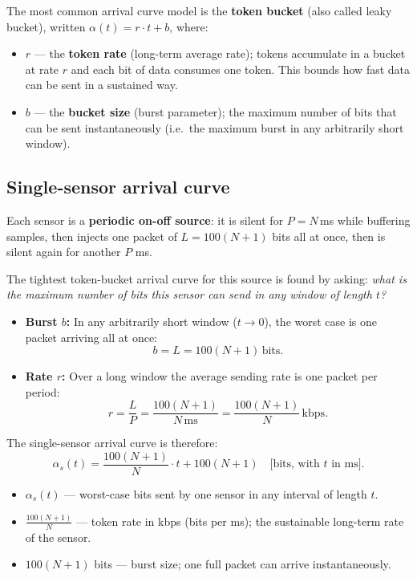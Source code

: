 \documentclass[12pt, a4paper]{article}
\begin{document}
The most common arrival curve model is the \textbf{token bucket} (also called
leaky bucket), written $\alpha(t) = r \cdot t + b$, where:
\begin{itemize}[leftmargin=1.4em, itemsep=2pt]
  \item $r$ --- the \textbf{token rate} (long-term average rate); tokens
    accumulate in a bucket at rate $r$ and each bit of data consumes one token.
    This bounds how fast data can be sent in a sustained way.
  \item $b$ --- the \textbf{bucket size} (burst parameter); the maximum number
    of bits that can be sent instantaneously (i.e.\ the maximum burst in any
    arbitrarily short window).
\end{itemize}

\subsection*{Single-sensor arrival curve}

Each sensor is a \textbf{periodic on-off source}: it is silent for $P = N$\,ms
while buffering samples, then injects one packet of $L = 100(N+1)$ bits all
at once, then is silent again for another $P$ ms.

The tightest token-bucket arrival curve for this source is found by asking:
\emph{what is the maximum number of bits this sensor can send in any window of
length $t$?}

\begin{itemize}[leftmargin=1.4em, itemsep=4pt]
  \item \textbf{Burst $b$:} In any arbitrarily short window ($t \to 0$), the
    worst case is one packet arriving all at once:
    \[
      b = L = 100(N+1)\,\mathrm{bits}.
    \]
  \item \textbf{Rate $r$:} Over a long window the average sending rate is one
    packet per period:
    \[
      r = \frac{L}{P} = \frac{100(N+1)}{N\,\mathrm{ms}}
        = \frac{100(N+1)}{N}\,\mathrm{kbps}.
    \]
\end{itemize}

The single-sensor arrival curve is therefore:
\[
  \boxed{\alpha_s(t) = \frac{100(N+1)}{N}\cdot t + 100(N+1) \quad
  \text{[bits, with $t$ in ms]}.}
\]
\begin{itemize}[leftmargin=1.4em, itemsep=2pt]
  \item $\alpha_s(t)$ --- worst-case bits sent by one sensor in any interval of
    length $t$.
  \item $\frac{100(N+1)}{N}$ --- token rate in kbps (bits per ms); the
    sustainable long-term rate of the sensor.
  \item $100(N+1)$ bits --- burst size; one full packet can arrive
    instantaneously.
\end{itemize}
\end{document}
